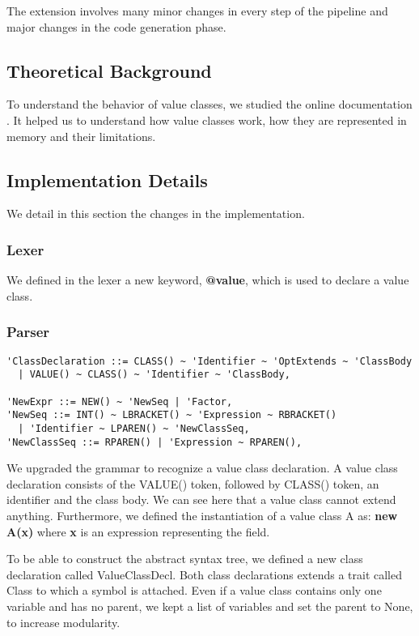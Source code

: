 The extension involves many minor changes in every step of the pipeline and major changes in the code generation phase.

\subsection{Theoretical Background}
To understand the behavior of value classes, we studied the online documentation \cite{ScalaDoc}. 
It helped us to understand how value classes work, how they are represented in memory and their limitations. 

\subsection{Implementation Details}
We detail in this section the changes in the implementation.

\subsubsection{Lexer}
We defined in the lexer a new keyword, \textbf{@value}, which is used to declare a value class.

\subsubsection{Parser}
\begin{verbatim}
'ClassDeclaration ::= CLASS() ~ 'Identifier ~ 'OptExtends ~ 'ClassBody 
  | VALUE() ~ CLASS() ~ 'Identifier ~ 'ClassBody,

'NewExpr ::= NEW() ~ 'NewSeq | 'Factor,
'NewSeq ::= INT() ~ LBRACKET() ~ 'Expression ~ RBRACKET() 
  | 'Identifier ~ LPAREN() ~ 'NewClassSeq,
'NewClassSeq ::= RPAREN() | 'Expression ~ RPAREN(),
\end{verbatim}

We upgraded the grammar to recognize a value class declaration. \newline
A value class declaration consists of the VALUE() token, followed by CLASS() token, an identifier and the class body. \newline
We can see here that a value class cannot extend anything. \newline
Furthermore, we defined the instantiation of a value class A as: \textbf{new A(x)} where \textbf{x} is an expression representing the field.

To be able to construct the abstract syntax tree, we defined a new class declaration called ValueClassDecl. 
Both class declarations extends a trait called Class to which a symbol is attached. \newline
Even if a value class contains only one variable and has no parent, we kept a list of variables and set the parent to None, to increase modularity.

